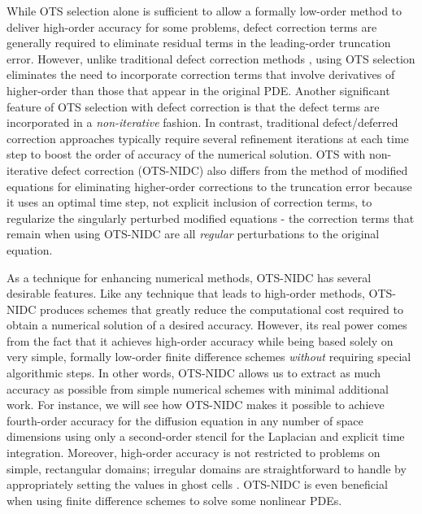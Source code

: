 \documentclass[fleqn,12pt,twoside]{article}
\begin{document}
While OTS selection alone is sufficient to allow a formally low-order method to
deliver high-order accuracy for some problems, defect correction terms are
generally required to eliminate residual terms in the leading-order truncation
error.  However, unlike traditional defect correction 
methods \cite{pereyra_1968,stetter_1978,gustafsson_2002,kress_2002,kress_2006}, 
using OTS selection eliminates the need to incorporate correction terms that
involve derivatives of higher-order than those that appear in the original PDE.
Another significant feature of OTS selection with defect correction
is that the defect terms are incorporated in a \emph{non-iterative} fashion.
In contrast, traditional defect/deferred correction approaches typically
require several refinement iterations at each time step to boost the order of
accuracy of the numerical solution.  OTS with non-iterative defect correction
(OTS-NIDC) also differs from the method of modified
equations \cite{griffiths_1986} for eliminating higher-order
corrections to the truncation error because it uses an optimal time
step, not explicit inclusion of correction terms, to regularize the
singularly perturbed modified equations - the correction terms that remain
when using OTS-NIDC are all \emph{regular} perturbations to the original
equation.

As a technique for enhancing numerical methods, OTS-NIDC has several desirable
features.  Like any technique that leads to high-order methods, OTS-NIDC
produces schemes that greatly reduce the computational cost required to obtain
a numerical solution of a desired accuracy.  However, its real power comes
from the fact that it achieves high-order accuracy while being based solely on
very simple, formally low-order finite difference schemes \emph{without}
requiring special algorithmic steps.  In other words, OTS-NIDC allows us to
extract as much accuracy as possible from simple numerical schemes with
minimal additional work.  For instance, we will see how OTS-NIDC makes it
possible to achieve fourth-order accuracy for the diffusion equation in any
number of space dimensions using only a second-order stencil for the Laplacian
and explicit time integration.  Moreover, high-order accuracy is not
restricted to problems on simple, rectangular domains; irregular domains are
straightforward to handle by appropriately setting the values in ghost
cells \cite{gibou_2005,ito_2005,fedkiw_1999,osher_fedkiw_book}.  
OTS-NIDC is even beneficial when using finite difference schemes to solve
some nonlinear PDEs.  
\end{document}
